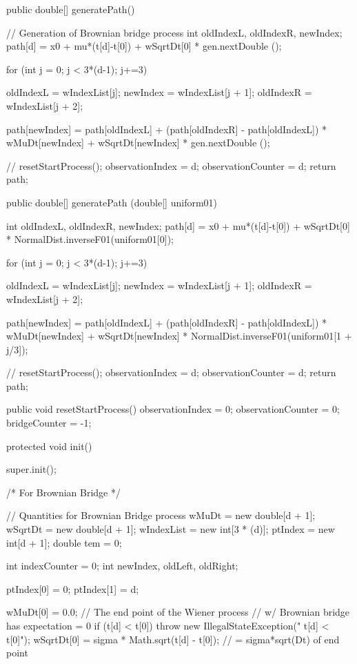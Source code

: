 \begin{code}
\begin{hide}
   public double[] generatePath() {
        // Generation of Brownian bridge process
        int oldIndexL, oldIndexR, newIndex;
        path[d] = x0 + mu*(t[d]-t[0]) + wSqrtDt[0] * gen.nextDouble ();

        for (int j = 0; j < 3*(d-1); j+=3) {
           oldIndexL   = wIndexList[j];
           newIndex    = wIndexList[j + 1];
           oldIndexR   = wIndexList[j + 2];

           path[newIndex] = path[oldIndexL] +
             (path[oldIndexR] - path[oldIndexL])
             * wMuDt[newIndex] + wSqrtDt[newIndex] * gen.nextDouble ();
        }

        //  resetStartProcess();
        observationIndex   = d;
        observationCounter = d;
        return path;
    }

    public double[] generatePath (double[] uniform01){
        int oldIndexL, oldIndexR, newIndex;
        path[d] = x0 + mu*(t[d]-t[0]) + wSqrtDt[0] * NormalDist.inverseF01(uniform01[0]);

        for (int j = 0; j < 3*(d-1); j+=3) {
           oldIndexL   = wIndexList[j];
           newIndex    = wIndexList[j + 1];
           oldIndexR   = wIndexList[j + 2];

           path[newIndex] = path[oldIndexL] +
             (path[oldIndexR] - path[oldIndexL])
             * wMuDt[newIndex] + wSqrtDt[newIndex] * NormalDist.inverseF01(uniform01[1 + j/3]);
        }

        //  resetStartProcess();
        observationIndex   = d;
        observationCounter = d;
        return path;
    }

    public void resetStartProcess() {
        observationIndex   = 0;
        observationCounter = 0;
        bridgeCounter = -1;
    }

    protected void init() {
      super.init();

      /* For Brownian Bridge */

      // Quantities for Brownian Bridge process
      wMuDt = new double[d + 1];
      wSqrtDt = new double[d + 1];
      wIndexList = new int[3 * (d)];
      ptIndex = new int[d + 1];
      double tem = 0;

      int indexCounter = 0;
      int newIndex, oldLeft, oldRight;

      ptIndex[0] = 0;
      ptIndex[1] = d;

      wMuDt[0] = 0.0;  // The end point of the Wiener process
      //  w/ Brownian bridge has expectation = 0
      if (t[d] < t[0])
         throw new IllegalStateException("   t[d] < t[0]");
      wSqrtDt[0] = sigma * Math.sqrt(t[d] - t[0]);
      // = sigma*sqrt(Dt) of end point

}
\end{hide}
\end{code}
